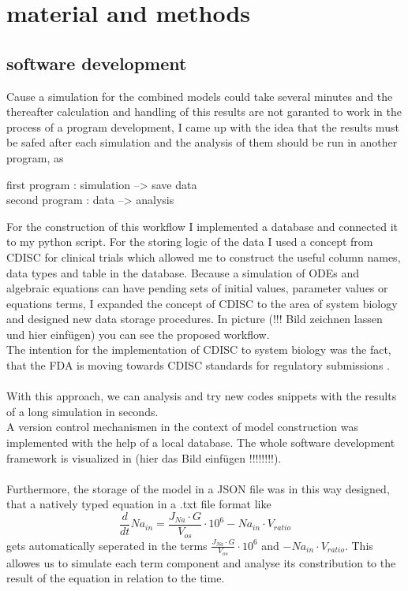 \section{material and methods}
\subsection{software development}
Cause a simulation for the combined models could take several minutes and the thereafter calculation and handling of this results are not garanted to work in the process of a program development, I came up with the idea that the results must be safed after each simulation and the analysis of them should be run in another program, as 
\begin{center}
	first program : simulation --> save data\\
	second program : data --> analysis
\end{center}
For the construction of this workflow I implemented a database and connected it to my python script. For the storing logic of the data I used a concept from CDISC for clinical trials which allowed me to construct the useful column names, data types and table in the database. Because a simulation of ODEs and algebraic equations can have pending sets of initial values, parameter values or equations terms, I expanded the concept of CDISC to the area of system biology and designed new data storage procedures. In picture (!!! Bild zeichnen lassen und hier einfügen) you can see  the proposed workflow. \\ The intention for the  implementation of CDISC to system biology was the fact, that the FDA is moving towards CDISC standards for regulatory submissions \cite{SDTMStandard}.\\\\
With this approach, we can analysis and try new codes snippets with the results of a long simulation in seconds. \\
A version control mechanismen in the context of model construction was implemented with the help of a local database. The whole software development framework is visualized in (hier das Bild einfügen !!!!!!!!). \\\\
Furthermore, the storage of the model in a JSON file was in this way designed, that a natively typed equation in a .txt file format like 
\begin{equation*}
	\frac{d}{dt} Na_{in} = \frac{J_{Na} \cdot G}{V_{os}} \cdot 10^6 - Na_{in} \cdot V_{ratio} 
\end{equation*}
gets automatically seperated in the terms $\frac{J_{Na} \cdot G}{V_{os}} \cdot 10^6$ and $- Na_{in} \cdot V_{ratio}$. This allowes us to simulate each term component and analyse its constribution to the result of the equation in relation to the time.\\
\newpage